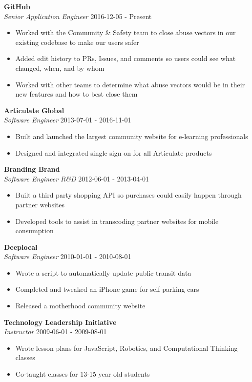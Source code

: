 \documentclass[a4paper]{article}
\begin{document}
\textbf{GitHub}\\
\textit{Senior Application Engineer} \hfill 2016-12-05 - Present\\
\vspace{-1mm}
\begin{itemize} \itemsep 1pt
	\item Worked with the Community \& Safety team to close abuse vectors in our existing codebase to make our users safer
	\item Added edit history to PRs, Issues, and comments so users could see what changed, when, and by whom
	\item Worked with other teams to determine what abuse vectors would be in their new features and how to best close them
\end{itemize}
\textbf{Articulate Global}\\
\textit{Software Engineer} \hfill 2013-07-01 - 2016-11-01\\
\vspace{-1mm}
\begin{itemize} \itemsep 1pt
	\item Built and launched the largest community website for e-learning professionals
	\item Designed and integrated single sign on for all Articulate products
\end{itemize}
\textbf{Branding Brand}\\
\textit{Software Engineer R\&D} \hfill 2012-06-01 - 2013-04-01\\
\vspace{-1mm}
\begin{itemize} \itemsep 1pt
	\item Built a third party shopping API so purchases could easily happen through partner websites
	\item Developed tools to assist in \textquotedbl{}transcoding\textquotedbl{} partner websites for mobile consumption
\end{itemize}
\textbf{Deeplocal}\\
\textit{Software Engineer} \hfill 2010-01-01 - 2010-08-01\\
\vspace{-1mm}
\begin{itemize} \itemsep 1pt
	\item Wrote a script to automatically update public transit data
	\item Completed and tweaked an iPhone game for self parking cars
	\item Released a motherhood community website
\end{itemize}
\textbf{Technology Leadership Initiative}\\
\textit{Instructor} \hfill 2009-06-01 - 2009-08-01\\
\vspace{-1mm}
\begin{itemize} \itemsep 1pt
	\item Wrote lesson plans for JavaScript, Robotics, and Computational Thinking classes
	\item Co-taught classes for 13-15 year old students
\end{itemize}
\end{document}
